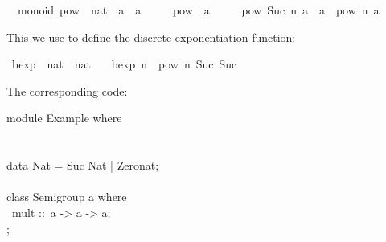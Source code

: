 \begin{isabellebody}
%
\isadelimquote
%
\endisadelimquote
%
\isatagquote
{}\isamarkupfalse%
\ {\isacharparenleft}\ monoid{\isacharparenright}\ pow\ {\isacharcolon}{\isacharcolon}\ {\isachardoublequoteopen}nat\ {\isasymRightarrow}\ {\isacharprime}a\ {\isasymRightarrow}\ {\isacharprime}a{\isachardoublequoteclose}\ \isanewline
\ \ \ \ {\isachardoublequoteopen}pow\ {}\ a\ {\isacharequal}\ {\isasymone}{\isachardoublequoteclose}\isanewline
\ \ {\isacharbar}\ {\isachardoublequoteopen}pow\ {\isacharparenleft}Suc\ n{\isacharparenright}\ a\ {\isacharequal}\ a\ {\isasymotimes}\ pow\ n\ a{\isachardoublequoteclose}%
\endisatagquote
{\isafoldquote}%
%
\isadelimquote
%
\endisadelimquote
%
\begin{isamarkuptext}%
\noindent This we use to define the discrete exponentiation function:%
\end{isamarkuptext}%
\isamarkuptrue%
%
\isadelimquote
%
\endisadelimquote
%
\isatagquote
{}\isamarkupfalse%
\ bexp\ {\isacharcolon}{\isacharcolon}\ {\isachardoublequoteopen}nat\ {\isasymRightarrow}\ nat{\isachardoublequoteclose}\ \isanewline
\ \ {\isachardoublequoteopen}bexp\ n\ {\isacharequal}\ pow\ n\ {\isacharparenleft}Suc\ {\isacharparenleft}Suc\ {}{\isacharparenright}{\isacharparenright}{\isachardoublequoteclose}%
\endisatagquote
{\isafoldquote}%
%
\isadelimquote
%
\endisadelimquote
%
\begin{isamarkuptext}%
\noindent The corresponding code:%
\end{isamarkuptext}%
\isamarkuptrue%
%
\isadelimquote
%
\endisadelimquote
%
\isatagquote
%
\begin{isamarkuptext}%
\isaverbatim%
\noindent%
\hspace*{0pt}module Example where {}\\
\hspace*{0pt}\\
\hspace*{0pt}\\
\hspace*{0pt}data Nat = Suc Nat | Zero{}nat;\\
\hspace*{0pt}\\
\hspace*{0pt}class Semigroup a where {}\\
\hspace*{0pt} ~mult ::~a -> a -> a;\\
\hspace*{0pt}{\char125};\\

\end{isamarkuptext}
\end{isabellebody}
